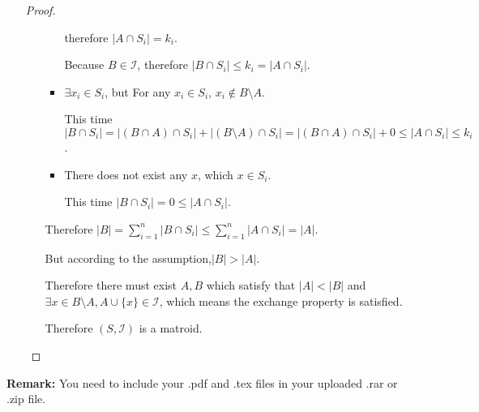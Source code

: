 \documentclass[12pt,a4paper]{article}
\theoremstyle{definition}
\begin{document}
\begin{enumerate}
\begin{proof}
\begin{itemize}
\begin{itemize}
               	    therefore $|A\cap S_i|=k_i$.
               	    
               	    Because $B\in \mathcal{I}$, therefore $|B\cap S_i|\le k_i=|A\cap S_i|$.
               	\item 
               	    $\exists x_i \in S_i$, but For any $x_i\in S_i$, $x_i \notin B\setminus A$.
               	    
               	    This time $|B\cap S_i|=|(B\cap A)\cap S_i|+|(B \setminus A)\cap S_i|=|(B\cap A)\cap S_i|+0\le|A\cap S_i|\le k_i$.
               	\item 
               	   There does not exist any $x$, which $x\in S_i$.
               	   
               	   This time $|B\cap S_i|=0\le|A\cap S_i|$. 
               \end{itemize} 
               Therefore $|B|=\sum_{i=1}^{n} |B\cap S_i|\le\sum_{i=1}^{n} |A\cap S_i|=|A|$.
               
               But according to the assumption,$|B|>|A|$.
               
               Therefore there must exist $A,B$ which satisfy that $|A|<|B|$ and $\exists x \in B\setminus A, A\cup \{x\} \in \mathcal{I}$, which means the exchange property  is satisfied.
               
               Therefore $(S,\mathcal{I})$ is a matroid.
    	\end{itemize}
       
    \end{proof}

\end{enumerate}

\vspace{20pt}

\textbf{Remark:} You need to include your .pdf and .tex files in your uploaded .rar or .zip file.

\end{document}
